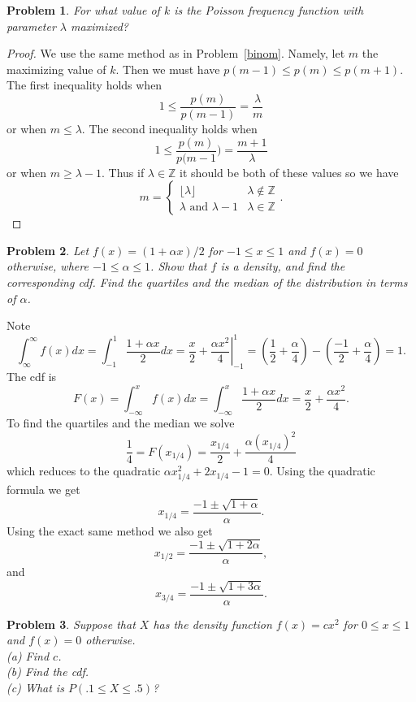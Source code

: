 \documentclass{article}
\newtheorem{problem}{Problem}
\begin{document}
\begin{problem}
For what value of $k$ is the Poisson frequency function with parameter $\lambda$ maximized?
\end{problem}
\begin{proof}
We use the same method as in Problem~\ref{binom}. Namely, let $m$ the maximizing value of $k$. Then we must have $p(m-1) \leq p(m) \leq p(m+1)$. The first inequality holds when
\[
1 \leq \frac{p(m)}{p(m-1)} = \frac{\lambda}{m}
\]
or when $m \leq \lambda$. The second inequality holds when
\[
1 \leq \frac{p(m)}{p(m-1}) = \frac{m+1}{\lambda}
\]
or when $m \geq \lambda - 1$. Thus if $\lambda \in \mathbb{Z}$ it should be both of these values so we have
\[
m =
\begin{cases}
\lfloor \lambda \rfloor & \lambda \notin \mathbb{Z}\\
\text{$\lambda$ and $\lambda-1$} & \lambda \in \mathbb{Z}
\end{cases}.
\]
\end{proof}

\begin{problem}
Let $f(x) = (1 + \alpha x)/2$ for $-1 \leq x \leq 1$ and $f(x) = 0$ otherwise, where $-1 \leq \alpha \leq 1$. Show that $f$ is a density, and find the corresponding cdf. Find the quartiles and the median of the distribution in terms of $\alpha$.
\end{problem}

Note
\[
\int_{\infty}^{\infty} f(x) dx = \int_{-1}^{1} \frac{1 + \alpha x}{2} dx = \left. \frac{x}{2} + \frac{\alpha x^2}{4} \right |_{-1}^{1} = \left (\frac{1}{2} + \frac{\alpha}{4} \right ) - \left (\frac{-1}{2} + \frac{\alpha}{4} \right ) = 1.
\]
The cdf is
\[
F(x) = \int_{-\infty}^{x} f(x) dx = \int_{-\infty}^{x} \frac{1 + \alpha x}{2} dx = \frac{x}{2} + \frac{\alpha x^2}{4}.
\]
To find the quartiles and the median we solve
\[
\frac{1}{4} = F(x_{1/4}) = \frac{x_{1/4}}{2} + \frac{\alpha (x_{1/4})^2}{4}
\]
which reduces to the quadratic $\alpha x_{1/4}^2 + 2 x_{1/4} - 1 = 0$. Using the quadratic formula we get
\[
x_{1/4} = \frac{-1 \pm \sqrt{1 + \alpha}}{\alpha}.
\]
Using the exact same method we also get
\[
x_{1/2} = \frac{-1 \pm \sqrt{1 + 2\alpha}}{\alpha},
\]
and
\[
x_{3/4} = \frac{-1 \pm \sqrt{1 + 3\alpha}}{\alpha}.
\]

\begin{problem}
Suppose that $X$ has the density function $f(x) = cx^2$ for $0 \leq x \leq 1$ and $f(x) = 0$ otherwise.\\
(a) Find $c$.\\
(b) Find the cdf.\\
(c) What is $P(.1 \leq X \leq .5)$?
\end{problem}
\end{document}
